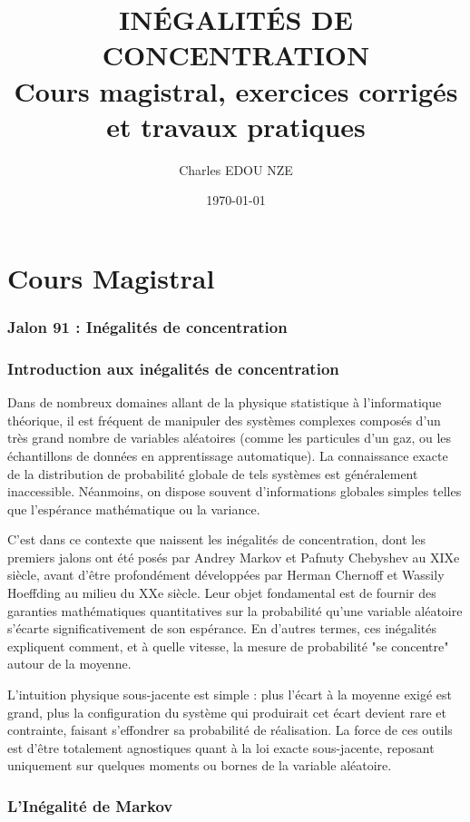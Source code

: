 \documentclass[11pt,a4paper]{article}
\title{\Huge INÉGALITÉS DE CONCENTRATION \\ \large Cours magistral, exercices corrigés et travaux pratiques}
\author{\Large Charles EDOU NZE}
\date{\today}
\begin{document}
\maketitle
\tableofcontents
\newpage

\part{Cours Magistral}

\section*{Jalon 91 : Inégalités de concentration}

\section{Introduction aux inégalités de concentration}

Dans de nombreux domaines allant de la physique statistique à l'informatique théorique, il est fréquent de manipuler des systèmes complexes composés d'un très grand nombre de variables aléatoires (comme les particules d'un gaz, ou les échantillons de données en apprentissage automatique). La connaissance exacte de la distribution de probabilité globale de tels systèmes est généralement inaccessible. Néanmoins, on dispose souvent d'informations globales simples telles que l'espérance mathématique ou la variance.

C'est dans ce contexte que naissent les inégalités de concentration, dont les premiers jalons ont été posés par Andrey Markov et Pafnuty Chebyshev au XIXe siècle, avant d'être profondément développées par Herman Chernoff et Wassily Hoeffding au milieu du XXe siècle. Leur objet fondamental est de fournir des garanties mathématiques quantitatives sur la probabilité qu'une variable aléatoire s'écarte significativement de son espérance. En d'autres termes, ces inégalités expliquent comment, et à quelle vitesse, la mesure de probabilité "se concentre" autour de la moyenne.

L'intuition physique sous-jacente est simple : plus l'écart à la moyenne exigé est grand, plus la configuration du système qui produirait cet écart devient rare et contrainte, faisant s'effondrer sa probabilité de réalisation. La force de ces outils est d'être totalement agnostiques quant à la loi exacte sous-jacente, reposant uniquement sur quelques moments ou bornes de la variable aléatoire.

\section{L'Inégalité de Markov}
\end{document}

